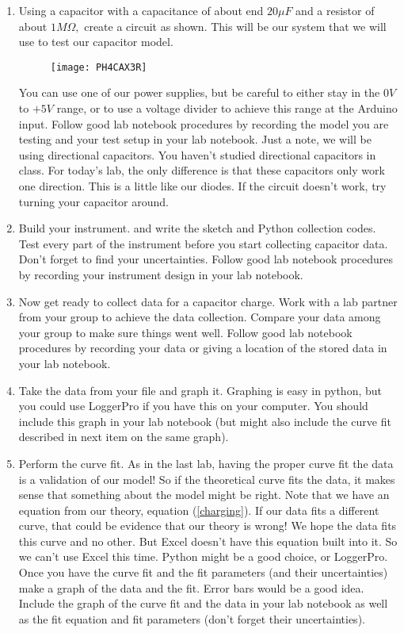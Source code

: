 \begin{enumerate}
	\item 	Using a capacitor with a capacitance of about end $20\unit{\mu F}$ and a resistor of about $1\unit{M\Omega},$ create a circuit as shown. This will be our system that we will use to test our capacitor model.
	
	\begin{figure}[h!]
		\centering
		\texttt{[image: PH4CAX3R]}
	\end{figure}

	You can use one of our power supplies, but be careful to either stay in the $0\unit{V}$ to $+5\unit{V}$ range, or to use a voltage divider to achieve this range at the Arduino input. Follow good lab notebook procedures by recording the model you are testing and your test setup in your lab notebook. Just a note, we will be using directional capacitors. You haven't studied directional capacitors in class. For today's lab, the only difference is that these capacitors only work one direction. This is a little like our diodes. If the circuit doesn't work, try turning your capacitor around.

	\item Build your instrument. and write the sketch and Python collection codes. Test every part of the instrument before you start collecting capacitor data. Don't forget to find your uncertainties. Follow good lab notebook procedures by recording your instrument design in your lab notebook.

	\item Now get ready to collect data for a capacitor charge. Work with a lab partner from your group to achieve the data collection. Compare your data among your group to make sure things went well. Follow good lab notebook procedures by recording your data or giving a location of the stored data in your lab notebook. 
	
	\item Take the data from your file and graph it. Graphing is easy in python, but you could use LoggerPro if you have this on your computer. You should include this graph in your lab notebook (but might also include the curve fit described in  next item on the same graph).

	\item Perform the curve fit. As in the last lab, having the proper curve fit the data is a validation of our model! So if the theoretical curve fits the data, it makes sense that something about the model might be right. Note that we have an equation from our theory, equation (\ref{charging}). If our data fits a different curve, that could be evidence that our theory is wrong! We hope the data fits this curve and no other. But Excel doesn't have this equation built into it. So we can't use Excel this time.  Python might be a good choice, or LoggerPro.  Once you have the curve fit and the fit parameters (and their uncertainties) make a graph of the data and the fit. Error bars would be a good idea. Include the graph of the curve fit and the data in your lab notebook as well as the fit equation and fit parameters (don't forget their uncertainties).


\end{enumerate}
